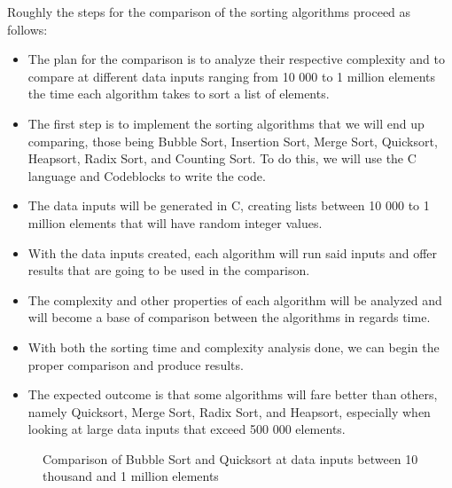 \documentclass{article}
\numberwithin{figure}{section}
\begin{document}
Roughly the steps for the comparison of the sorting algorithms proceed as follows:
\begin{itemize}
\item The plan for the comparison is to analyze their respective complexity and to compare at different data inputs ranging from 10 000 to 1 million elements the time each algorithm takes to sort a list of elements.
\pagebreak

\item The first step is to implement the sorting algorithms that we will end up comparing, those being Bubble Sort, Insertion Sort, Merge Sort, Quicksort, Heapsort, Radix Sort, and Counting Sort. To do this, we will use the C language and Codeblocks to write the code.

\item The data inputs will be generated in C, creating lists between 10 000 to 1 million elements that will have random integer values.

\item With the data inputs created, each algorithm will run said inputs and offer results that are going to be used in the comparison.

\item The complexity and other properties of each algorithm will be analyzed and will become a base of comparison between the algorithms in regards time.

\item With both the sorting time and complexity analysis done, we can begin the proper comparison and produce results.

\item The expected outcome is that some algorithms will fare better than others, namely Quicksort, Merge Sort, Radix Sort, and Heapsort, especially when looking at large data inputs that exceed 500 000 elements.
\end{itemize}

\begin{figure}[h]
    \centering
    \caption{Comparison of Bubble Sort and Quicksort at data inputs between 10 thousand and 1 million elements}
    \label{fig:exp1}
\end{figure}
\pagebreak
\end{document}
